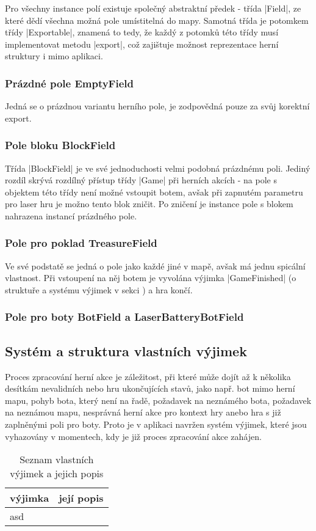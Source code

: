 Pro všechny instance polí existuje společný abstraktní předek - třída \ic|Field|, ze které dědí všechna možná pole umístitelná do mapy. Samotná třída je potomkem třídy \ic|Exportable|, znamená to tedy, že každý z potomků této třídy musí implementovat metodu \ic|export|, což zajištuje možnost reprezentace herní struktury i mimo aplikaci.

\subsubsection{Prázdné pole EmptyField}

Jedná se o prázdnou variantu herního pole, je zodpovědná pouze za svůj korektní export.

\subsubsection{Pole bloku BlockField}

Třída \ic|BlockField| je ve své jednoduchosti velmi podobná prázdnému poli. Jediný rozdíl skrývá rozdílný přístup třídy \ic|Game| při herních akcích - na pole s objektem této třídy není možné vstoupit botem, avšak při zapnutém parametru pro laser hru je možno tento blok zničit. Po zničení je instance pole s blokem nahrazena instancí prázdného pole.

\subsubsection{Pole pro poklad TreasureField}

Ve své podstatě se jedná o pole jako každé jiné v mapě, avšak má jednu spicální vlastnost. Při vstoupení na něj botem je vyvolána výjimka \ic|GameFinished| (o struktuře a systému výjimek v sekci ) a hra končí. 

\subsubsection{Pole pro boty BotField a LaserBatteryBotField}

\subsection{Systém a struktura vlastních výjimek}
\label{subsec:custom-exceptions}

Proces zpracování herní akce je záležitost, při které může dojít až k několika desítkám nevalidních nebo hru ukončujících stavů, jako např. bot mimo herní mapu, pohyb bota, který není na řadě, požadavek na neznámého bota, požadavek na neznámou mapu, nesprávná herní akce pro kontext hry anebo hra s již zaplněnými poli pro boty. Proto je v aplikaci navržen systém výjimek, které jsou vyhazovány v momentech, kdy je již proces zpracování akce zahájen.

\begin{table}[H]
	\begin{tabularx}{\textwidth}{| l | X |}
		výjimka & její popis \\
		\hline
		asd & \lipsum[1] \\
	\end{tabularx}
	\caption{Seznam vlastních výjimek a jejich popis}
\end{table}
